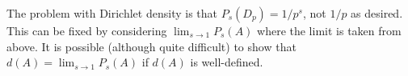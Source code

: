 \documentclass[11pt]{article}
\begin{document}
\begin{enumerate}
{The problem with Dirichlet density is that $P_s(D_p) = 1/p^s$, not $1/p$ as desired. This can be fixed by considering $\lim_{s \to 1} P_s(A)$ where the limit is taken from above. It is possible (although quite difficult) to show that $d(A) = \lim_{s \to 1} P_s(A)$ if $d(A)$ is well-defined.}

\end{enumerate}
\end{document}
